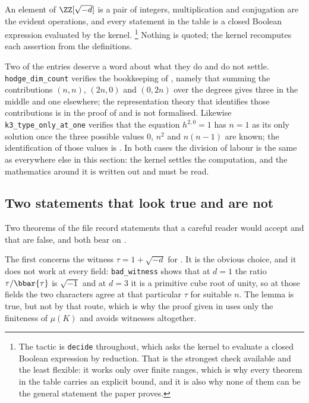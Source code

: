 \endgroup

An element of $\ZZ[\sqrt{-d}]$ is a pair of integers, multiplication and
conjugation are the evident operations, and every statement in the table is a
closed Boolean expression evaluated by the kernel.%
\footnote{The tactic is \texttt{decide} throughout, which asks the kernel to evaluate a closed Boolean expression by reduction. That is the strongest check available and the least flexible: it works only over finite ranges, which is why every theorem in the table carries an explicit bound, and it is also why none of them can be the general statement the paper proves.} Nothing is quoted; the
kernel recomputes each assertion from the definitions.

Two of the entries deserve a word about what they do and do not settle.
\texttt{hodge\_dim\_count} verifies the bookkeeping of
, namely that summing the contributions
$(n,n)$, $(2n,0)$ and $(0,2n)$ over the degrees gives three in the middle and
one elsewhere; the representation theory that identifies those contributions is
in the proof of  and is not formalised. Likewise
\texttt{k3\_type\_only\_at\_one} verifies that the equation $h^{2,0}=1$ has
$n=1$ as its only solution once the three possible values $0$, $n^{2}$ and
$n(n-1)$ are known; the identification of those values is
. In both cases the division of labour is the same as
everywhere else in this section: the kernel settles the computation, and the
mathematics around it is written out and must be read.

\subsection{Two statements that look true and are not}

Two theorems of the file record statements that a careful reader would accept
and that are false, and both bear on .

The first concerns the witness $\tau=1+\sqrt{-d}$ for .
It is the obvious choice, and it does not work at every field:
\texttt{bad\_witness} shows that at $d=1$ the ratio $\tau/\bbar{\tau}$ is
$\sqrt{-1}$ and at $d=3$ it is a primitive cube root of unity, so at those
fields the two characters agree at that particular $\tau$ for suitable $n$.
The lemma is true, but not by that route, which is why the proof given in
 uses only the finiteness of $\mu(K)$ and avoids
witnesses altogether.


